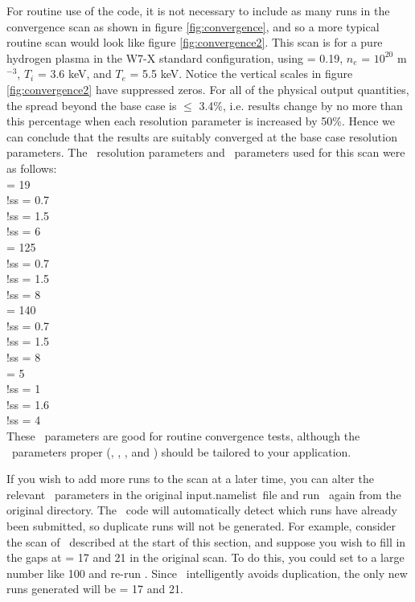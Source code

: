 For routine use of the code, it is not necessary to include as many
runs in the convergence scan as shown in figure \ref{fig:convergence},
and so a more typical routine scan would look like figure \ref{fig:convergence2}.
This scan is for a pure hydrogen plasma in the W7-X standard configuration, using  = 0.19,
$n_e$ = $10^{20}$ m$^{-3}$, $T_i$ = 3.6 keV, and $T_e$ = 5.5 keV.
Notice the vertical scales in figure \ref{fig:convergence2} have suppressed zeros.
For all of the physical output quantities, the spread beyond the base case is $\le$ 3.4\%,
i.e. results change by no more than this percentage when each resolution
parameter is increased by 50\%. Hence we can conclude that 
the results are suitably converged at the base case resolution parameters.
The \sfincs~resolution parameters and \sfincsScan~parameters used for this scan were as follows:\\
{\ttfamily
\Ntheta = 19 \\
!ss  = 0.7 \\
!ss  = 1.5 \\
!ss  = 6 \\
\Nzeta = 125 \\
!ss  = 0.7 \\
!ss  = 1.5 \\
!ss  = 8 \\
\Nxi = 140 \\
!ss  = 0.7 \\
!ss  = 1.5 \\
!ss  = 8 \\
\Nx = 5 \\
!ss  = 1 \\
!ss  = 1.6 \\
!ss  = 4 \\
}
These \sfincsScan~parameters are good for routine convergence tests, although the \sfincs~parameters proper
(\Ntheta, \Nzeta, \Nxi, and \Nx) should be tailored to your application.

If you wish to add more runs to the scan at a later time,
you can alter the relevant \sfincsScan~parameters in the original {\ttfamily input.namelist}~file
and run \sfincsScan~again from the original directory.  The \sfincsScan~code will automatically detect which runs
have already been submitted, so duplicate runs will not be generated.
For example, consider the scan of \Ntheta~described at the start of this section,
and suppose you wish to fill in the gaps at \Ntheta = 17 and 21 in the original scan.
To do this, you could set  to a large number like 100
and re-run \sfincsScan.  Since \sfincsScan~intelligently avoids duplication,
the only new runs generated will be  \Ntheta = 17 and 21.

